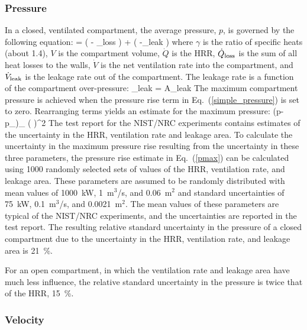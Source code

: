 \subsubsection{Pressure}

In a closed, ventilated compartment, the average pressure, $p$, is governed by the following equation:
\be
    =  \left(  - _{\rm loss} \right) +  \left( -_{\rm leak} \right) \label{simple_pressure}
\ee
where $\gamma$ is the ratio of specific heats (about 1.4), $V$ is the compartment volume, $\dot{Q}$ is the HRR, $\dot{Q}_{\rm loss}$ is the sum of all heat losses to the walls, $\dot{V}$ is the net ventilation rate into the compartment, and $\dot{V}_{\rm leak}$ is the leakage rate out of the compartment. The leakage rate is a function of the compartment over-pressure:
\be
   _{\rm leak} = A_{\rm leak} 
\ee
The maximum compartment pressure is achieved when the pressure rise term in Eq.~(\ref{simple_pressure}) is set to zero. Rearranging terms yields an estimate for the maximum pressure:
\be
   (p-p_\infty)_{\max} \approx {} \left(  \right)^2 \label{pmax}
\ee
The test report for the NIST/NRC experiments contains estimates of the uncertainty in the HRR, ventilation rate and leakage area. To calculate the uncertainty in the maximum pressure rise resulting from the uncertainty in these three parameters, the pressure rise estimate in Eq.~(\ref{pmax}) can be calculated using 1000 randomly selected sets of values of the HRR, ventilation rate, and leakage area. These parameters are assumed to be randomly distributed with mean values of 1000~kW, 1~m$^3$/s, and 0.06~m$^2$ and standard uncertainties of 75~kW, 0.1~m$^3$/s, and 0.0021~m$^2$. The mean values of these parameters are typical of the NIST/NRC experiments, and the uncertainties are reported in the test report. The resulting relative standard uncertainty in the pressure of a closed compartment due to the uncertainty in the HRR, ventilation rate, and leakage area is 21~\%.

For an open compartment, in which the ventilation rate and leakage area have much less influence, the relative standard uncertainty in the pressure is twice that of the HRR, 15~\%.

\subsubsection{Velocity}

